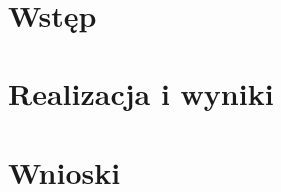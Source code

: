 \documentclass[11pt,a4paper,oneside]{mwart}
\begin{document}



\newpage
\thispagestyle{empty}
~~~~~~~~~~~~~~
\newpage

\setcounter{tocdepth}{3}
\tableofcontents
\newpage
\section{Wstęp}

\section{Realizacja i wyniki}

\section{Wnioski}
\end{document}
